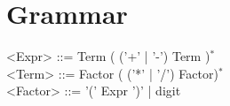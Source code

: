 \documentclass[10pt,letterpaper]{article}
\begin{document}
\section{Grammar}

<Expr> ::= Term ( ('+' | '-') Term )$^{*}$\\
<Term> ::= Factor ( ('*' | '/') Factor)$^{*}$\\
<Factor> ::= '(' Expr ')' | digit
\end{document}
